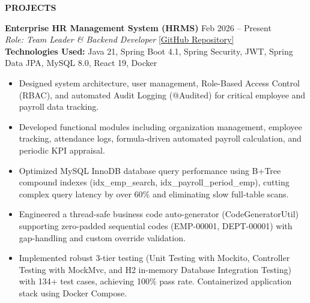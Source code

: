 ﻿\documentclass[11pt,a4paper]{article}
\newcommand{\cvsection}[1]{%
  \vspace{7pt}%
  \noindent\textbf{\large #1}\par%
  \vspace{3pt}%
}
\begin{document}
\newpage %

\cvsection{PROJECTS}

\noindent
\textbf{Enterprise HR Management System (HRMS)} \hfill Feb 2026 -- Present \\
\textit{Role: Team Leader \& Backend Developer} \hfill \href{https://github.com/ng-doanh/hr-management-system}{[GitHub Repository]} \\
\textbf{Technologies Used:} Java 21, Spring Boot 4.1, Spring Security, JWT, Spring Data JPA, MySQL 8.0, React 19, Docker
\begin{itemize}[leftmargin=1.5em, itemsep=2pt, topsep=2pt]
    \item Designed system architecture, user management, Role-Based Access Control (RBAC), and automated Audit Logging (@Audited) for critical employee and payroll data tracking.
    \item Developed functional modules including organization management, employee tracking, attendance logs, formula-driven automated payroll calculation, and periodic KPI appraisal.
    \item Optimized MySQL InnoDB database query performance using B+Tree compound indexes (idx\_emp\_search, idx\_payroll\_period\_emp), cutting complex query latency by over 60\% and eliminating slow full-table scans.
    \item Engineered a thread-safe business code auto-generator (CodeGeneratorUtil) supporting zero-padded sequential codes (EMP-00001, DEPT-00001) with gap-handling and custom override validation.
    \item Implemented robust 3-tier testing (Unit Testing with Mockito, Controller Testing with MockMvc, and H2 in-memory Database Integration Testing) with 134+ test cases, achieving 100\% pass rate. Containerized application stack using Docker Compose.
\end{itemize}

\vspace{6pt}
\end{document}
